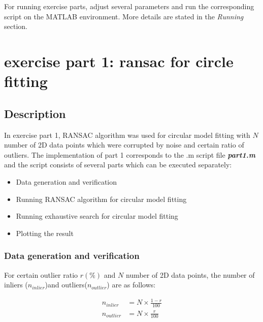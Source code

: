 \documentclass[paper=a4, fontsize=11pt]{scrartcl} %
\numberwithin{equation}{section} %
\numberwithin{figure}{section} %
\numberwithin{table}{section} %
\newcommand{\filename}[1]{\textbf{\textit{#1}}}
\begin{document}
For running exercise parts, adjust several parameters and run the corresponding script on the MATLAB environment. More details are stated in the \textit{Running} section.


\section{exercise part 1: ransac for circle fitting}

\subsection{Description}

In exercise part 1, RANSAC algorithm was used for circular model fitting with $N$ number of 2D data points which were corrupted by noise and certain ratio of outliers. The implementation of part 1 corresponds to the .m script file \filename{part1.m} and the script consists of several parts which can be executed separately: 

\begin{itemize}
\item Data generation and verification
\item Running RANSAC algorithm for circular model fitting
\item Running exhaustive search for circular model fitting
\item Plotting the result
\end{itemize}  

\subsubsection{Data generation and verification}

For certain outlier ratio $r  (\%)$ and $N$ number of 2D data points, the number of inliers ($n_{inlier}$)and outliers($n_{outlier}$) are as follows:

\begin{align*}
n_{inlier} &= N \times \frac{1 - r}{100}  \\
n_{outlier} &= N \times \frac{r}{100} 
\end{align*}
\end{document}
